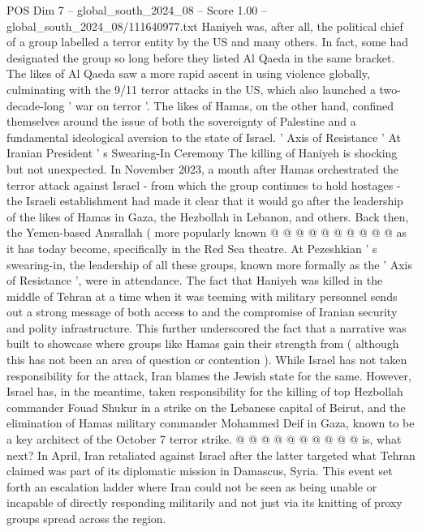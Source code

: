 \begin{textsample}{POS Dim 7 – global\_south\_2024\_08 – Score 1.00 – global\_south\_2024\_08/111640977.txt}  \label{ex:f7_pos_076}
Haniyeh was, after all, the political chief of a group labelled a terror entity by the US and many others.
In fact, some had designated the group so long before they listed Al Qaeda in the same bracket.
The likes of Al Qaeda saw a more rapid ascent in using violence globally, culminating with the 9/11 terror attacks in the US, which also launched a two-decade-long ' war on terror '.
The likes of Hamas, on the other hand, confined themselves around the issue of both the sovereignty of Palestine and a fundamental ideological aversion to the state of Israel. ' Axis of Resistance ' At Iranian President ' s Swearing-In Ceremony The killing of Haniyeh is shocking but not unexpected.
In November 2023, a month after Hamas orchestrated the terror attack against Israel - from which the group continues to hold hostages - the Israeli establishment had made it clear that it would go after the leadership of the likes of Hamas in Gaza, the Hezbollah in Lebanon, and others.
Back then, the Yemen-based Ansrallah ( more popularly known @ @ @ @ @ @ @ @ @ @ as it has today become, specifically in the Red Sea theatre.
At Pezeshkian ' s swearing-in, the leadership of all these groups, known more formally as the ' Axis of Resistance ', were in attendance.
The fact that Haniyeh was killed in the middle of Tehran at a time when it was teeming with military personnel sends out a strong message of both access to and the compromise of Iranian security and polity infrastructure.
This further underscored the fact that a narrative was built to showcase where groups like Hamas gain their strength from ( although this has not been an area of question or contention ).
While Israel has not taken responsibility for the attack, Iran blames the Jewish state for the same.
However, Israel has, in the meantime, taken responsibility for the killing of top Hezbollah commander Fouad Shukur in a strike on the Lebanese capital of Beirut, and the elimination of Hamas military commander Mohammed Deif in Gaza, known to be a key architect of the October 7 terror strike. @ @ @ @ @ @ @ @ @ @ is, what next?
In April, Iran retaliated against Israel after the latter targeted what Tehran claimed was part of its diplomatic mission in Damascus, Syria.
This event set forth an escalation ladder where Iran could not be seen as being unable or incapable of directly responding militarily and not just via its knitting of proxy groups spread across the region.

\end{textsample}
